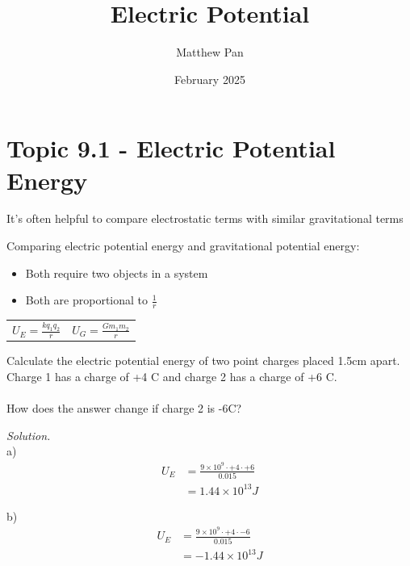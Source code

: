 \documentclass[12pt, titlepage]{article}
\title{Electric Potential}
\author{Matthew Pan}
\date{February 2025}
\begin{document}
\pagestyle{fancy}

\fancyhead{}
\fancyhead[R]{\thepage}

\maketitle

\section*{Topic 9.1 - Electric Potential Energy}
It's often helpful to compare electrostatic terms with similar gravitational terms

Comparing electric potential energy and gravitational potential energy:
\begin{itemize}
    \item{Both require two objects in a system}
    \item{Both are proportional to $\frac{1}{r}$}
\end{itemize}

\begin{center}
\begin{tabular}{ c c }
    $U_E=\frac{kq_1q_2}{r}$ & $U_G=\frac{Gm_1m_2}{r}$
\end{tabular}
\end{center}

\begin{Problem}
    Calculate the electric potential energy of two point charges placed 1.5cm apart. Charge 1 has a charge of +4 C and charge 2 has a charge of +6 C.
    \\ \\
    How does the answer change if charge 2 is -6C? 

    \tcblower

    \textit{Solution. \\}
    a)
    \begin{equation*}
    \begin{split}
            U_E&=\frac{9 \times 10^9 \cdot +4 \cdot +6}{0.015} \\
            &=1.44 \times 10^{13} J
    \end{split}
    \end{equation*}

    b)
    \begin{equation*}
        \begin{split}
                U_E&=\frac{9 \times 10^9 \cdot +4 \cdot -6}{0.015} \\
                &=-1.44 \times 10^{13} J
        \end{split}
        \end{equation*}
\end{Problem}
\end{document}
